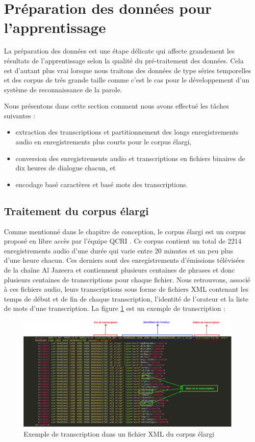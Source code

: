 \section{Préparation des données pour l'apprentissage}
La préparation des données est une étape délicate qui affecte grandement les résultats de l'apprentissage selon la qualité du pré-traitement des données. Cela est d'autant plus vrai lorsque nous traitons des données de type séries temporelles et des corpus de très grande taille \cite{timeseriesdata} comme c'est le cas pour le développement d'un système de reconnaissance de la parole.

Nous présentons dans cette section comment nous avons effectué les tâches suivantes : 
\begin{itemize}
    \item extraction des transcriptions et partitionnement des longs enregistrements audio en enregistrements plus courts pour le corpus élargi,
    \item conversion des enregistrements audio et transcriptions en fichiers binaires de dix heures de dialogue chacun, et
    \item encodage basé caractères et basé mots des transcriptions.
\end{itemize}

\subsection{Traitement du corpus élargi}
Comme mentionné dans le chapitre de conception, le corpus élargi est un corpus proposé en libre accès par l'équipe QCRI \cite{mgb2corpus}. Ce corpus contient un total de 2214 enregistrements audio d'une durée qui varie entre 20 minutes et un peu plus d'une heure chacun. Ces derniers sont des enregistrements d'émissions télévisées de la chaîne Al Jazeera et contiennent plusieurs centaines de phrases et donc plusieurs centaines de transcriptions pour chaque fichier. Nous retrouvons, associé à ces fichiers audio, leurs transcriptions sous forme de fichiers XML contenant les temps de début et de fin de chaque transcription, l'identité de l'orateur et la liste de mots d'une transcription. La figure \ref{xml_exemple} est un exemple de transcription :

 \begin{figure}[H]
     \centering
     \includegraphics[width=400pt]{images/chap4/example_trans.png}
     \caption{Exemple de transcription dans un fichier XML du corpus élargi}
     \label{xml_exemple}
 \end{figure}
 
